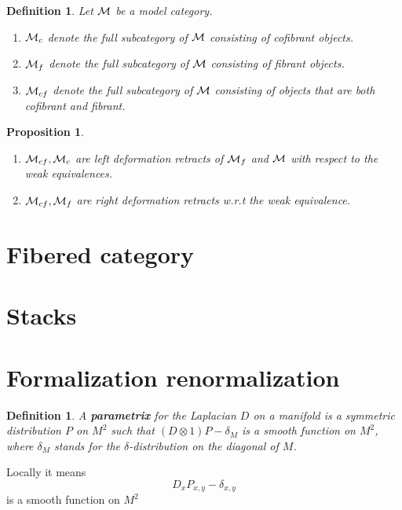 \documentclass[11pt]{article}
\newtheorem{prop}[thm]{Proposition}
\newtheorem{dfn}[thm]{Definition}
\newcommand{\calm}{{\cal M}}
\begin{document}
\begin{dfn}
Let $\calm$ be a model category. 
\begin{enumerate}
\item $\calm_c$ denote the full subcategory of $\calm$ consisting of cofibrant objects.
\item $\calm_f$ denote the full  subcategory of $\calm$ consisting of fibrant objects.
\item $\calm_{cf}$ denote the full subcategory of $\calm$ consisting of objects that are both cofibrant and fibrant.
\end{enumerate}
\end{dfn}
\begin{prop}
\begin{enumerate}
  \item $\calm_{cf},\calm_c$ are left deformation retracts of $\calm_f$ and $\calm$ with respect to the weak equivalences.
  \item $\calm_{cf},\calm_{f}$ are right deformation retracts w.r.t the weak equivalence.
\end{enumerate}
\end{prop}
\section{Fibered category}
\section{Stacks}
\section{Formalization renormalization}
\begin{dfn}
A \textbf{parametrix} for the Laplacian $D$ on a manifold is a symmetric distribution $P$ on $M^2$ such that $(D\otimes 1)P-\delta_M$ is a smooth function on $M^2$, where $\delta_M$ stands for the $\delta$-distribution on the diagonal of $M$.
\end{dfn}
Locally it means
$$
D_x P_{x,y}-\delta_{x,y}
$$
is a smooth function on $M^2$
\end{document}
